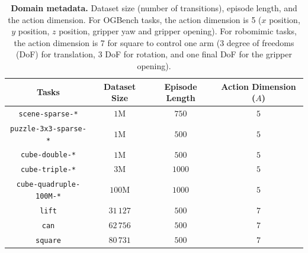 \begin{table}[ht]
    \centering
    \begin{tabular}{@{}cccc@{}}
        \toprule
        \textbf{Tasks} & \textbf{Dataset Size}  & \textbf{Episode Length} & \textbf{Action Dimension ($A$)} \\
        \midrule
        \texttt{scene-sparse-*}       &  $1$M & $750$ & $5$\\
        \texttt{puzzle-3x3-sparse-*}  &  $1$M & $500$ & $5$\\
        \texttt{cube-double-*} &  $1$M & $500$ & $5$\\
        \texttt{cube-triple-*} &  $3$M & $1000$ & $5$\\
        \texttt{cube-quadruple-100M-*} &  $100$M & $1000$ & $5$\\
        \texttt{lift}        &  $31\,127$& $500$ & $7$\\
        \texttt{can}        &  $62\,756$ & $500$ & $7$\\
        \texttt{square}        &  $80\,731$ & $500$ & $7$\\
    \bottomrule
    \end{tabular}
    \vspace{2mm}
    \caption{\footnotesize \textbf{Domain metadata.} Dataset size (number of transitions), episode length, and the action dimension. For OGBench tasks, the action dimension is 5 ($x$ position, $y$ position, $z$ position, gripper yaw and gripper opening). For robomimic tasks, the action dimension is 7 for square to control one arm (3 degree of freedoms (DoF) for translation, 3 DoF for rotation, and one final DoF for the gripper opening).}
    
    \label{tab:metadata}
\end{table}



